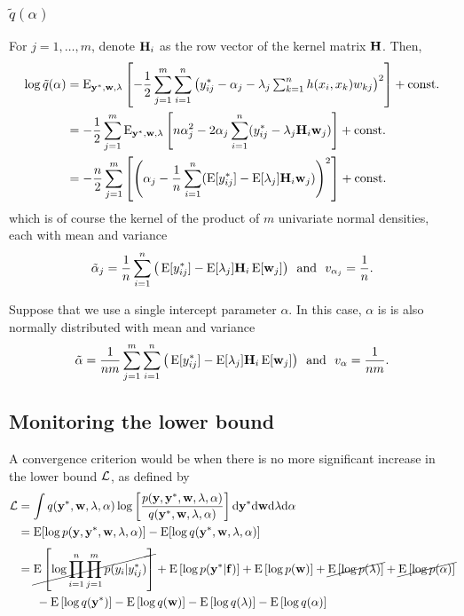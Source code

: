 \subsubsection{$\tilde q(\alpha)$}

For $j = 1,\dots,m$, denote $\bH_i$ as the row vector of the kernel matrix $\bH$. Then,
\begin{align*}
  \log \tilde q(\alpha) 
  &= \E_{\by^*, \bw, \lambda} \left[ 
  - \half \sum_{j=1}^m \sum_{i=1}^n \left( y_{ij}^* - \alpha_j 
  - \lambda_j \textstyle\sum_{k=1}^n h(x_i, x_k)w_{kj} \right)^2  
  \right] + \const \\  
  &= - \half \sum_{j=1}^m \E_{\by^*, \bw, \lambda} \left[ 
  n \alpha_j^2 - 2\alpha_j \sum_{i=1}^n(y_{ij}^* - \lambda_j \bH_i \bw_j) 
  \right] + \const \\  
  &= - \half[n] \sum_{j=1}^m \left[ \left( \alpha_j - \frac{1}{n} \sum_{i=1}^n(\E[y_{ij}^*] - \E[\lambda_j] \bH_i \bw_j) \right)^2 \right] + \const \\  
\end{align*}
which is of course the kernel of the product of $m$ univariate normal densities, each with mean and variance 
\[
   \tilde \alpha_j = \frac{1}{n} \sum_{i=1}^n \big(\E [y_{ij}^*] - \E[\lambda_j]\bH_i \E[\bw_j]  \big)
   \ \text{ and } \ 
   v_{\alpha_j} = \frac{1}{n}.
\]

Suppose that we use a single intercept parameter $\alpha$. In this case, $\alpha$ is is also normally distributed with mean and variance
\[
   \tilde \alpha = \frac{1}{nm} \sum_{j=1}^m \sum_{i=1}^n \big(\E [y_{ij}^*] - \E[\lambda_j]\bH_i \E[\bw_j]  \big)
   \ \text{ and } \ 
   v_{\alpha} = \frac{1}{nm}.
\]

\subsection{Monitoring the lower bound}

A convergence criterion would be when there is no more significant increase in the lower bound $\cL$, as defined by
\begin{align*}
  \cL &= \int q(\by^*,\bw,\lambda,\alpha) \log \left[ \frac{p(\by,\by^*,\bw,\lambda,\alpha)}{q(\by^*,\bw,\lambda,\alpha)} \right] \d\by^* \d\bw \d\lambda \d\alpha \\
  &= \E[\log p(\by,\by^*,\bw,\lambda,\alpha)] - \E[\log q(\by^*,\bw,\lambda,\alpha)] \\[8pt]
  &= \cancel{\E\left[\log \prod_{i=1}^n \prod_{j=1}^m p(y_{i}|y_{ij}^*)\right]}
  + \E\left[ \log p(\by^* | \bff) \right]
  + \E\left[ \log p(\bw) \right] 
  + \cancel{\E\left[ \log p(\lambda) \right]}
  + \cancel{\E\left[ \log p(\alpha) \right]}  \\
  &\phantom{==} - \E\left[ \log q(\by^*) \right]
  - \E\left[ \log q(\bw) \right]
  - \E\left[ \log q(\lambda) \right]
  - \E\left[ \log q(\alpha) \right]
\end{align*}

